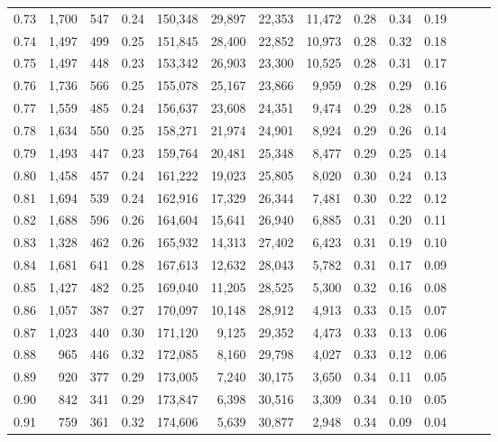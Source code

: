 \begin{tabular}{rrrrrrrrrrrrrr}
0.73 &  1,700 &  547 &  0.24 &  150,348 &   29,897 &  22,353 &  11,472 &  0.28 &  0.34 &      0.19 \\
0.74 &  1,497 &  499 &  0.25 &  151,845 &   28,400 &  22,852 &  10,973 &  0.28 &  0.32 &      0.18 \\
0.75 &  1,497 &  448 &  0.23 &  153,342 &   26,903 &  23,300 &  10,525 &  0.28 &  0.31 &      0.17 \\
0.76 &  1,736 &  566 &  0.25 &  155,078 &   25,167 &  23,866 &   9,959 &  0.28 &  0.29 &      0.16 \\
0.77 &  1,559 &  485 &  0.24 &  156,637 &   23,608 &  24,351 &   9,474 &  0.29 &  0.28 &      0.15 \\
0.78 &  1,634 &  550 &  0.25 &  158,271 &   21,974 &  24,901 &   8,924 &  0.29 &  0.26 &      0.14 \\
0.79 &  1,493 &  447 &  0.23 &  159,764 &   20,481 &  25,348 &   8,477 &  0.29 &  0.25 &      0.14 \\
0.80 &  1,458 &  457 &  0.24 &  161,222 &   19,023 &  25,805 &   8,020 &  0.30 &  0.24 &      0.13 \\
0.81 &  1,694 &  539 &  0.24 &  162,916 &   17,329 &  26,344 &   7,481 &  0.30 &  0.22 &      0.12 \\
0.82 &  1,688 &  596 &  0.26 &  164,604 &   15,641 &  26,940 &   6,885 &  0.31 &  0.20 &      0.11 \\
0.83 &  1,328 &  462 &  0.26 &  165,932 &   14,313 &  27,402 &   6,423 &  0.31 &  0.19 &      0.10 \\
0.84 &  1,681 &  641 &  0.28 &  167,613 &   12,632 &  28,043 &   5,782 &  0.31 &  0.17 &      0.09 \\
0.85 &  1,427 &  482 &  0.25 &  169,040 &   11,205 &  28,525 &   5,300 &  0.32 &  0.16 &      0.08 \\
0.86 &  1,057 &  387 &  0.27 &  170,097 &   10,148 &  28,912 &   4,913 &  0.33 &  0.15 &      0.07 \\
0.87 &  1,023 &  440 &  0.30 &  171,120 &    9,125 &  29,352 &   4,473 &  0.33 &  0.13 &      0.06 \\
0.88 &    965 &  446 &  0.32 &  172,085 &    8,160 &  29,798 &   4,027 &  0.33 &  0.12 &      0.06 \\
0.89 &    920 &  377 &  0.29 &  173,005 &    7,240 &  30,175 &   3,650 &  0.34 &  0.11 &      0.05 \\
0.90 &    842 &  341 &  0.29 &  173,847 &    6,398 &  30,516 &   3,309 &  0.34 &  0.10 &      0.05 \\
0.91 &    759 &  361 &  0.32 &  174,606 &    5,639 &  30,877 &   2,948 &  0.34 &  0.09 &      0.04 \\

\end{tabular}
